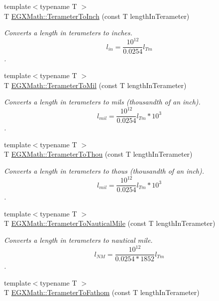 \begin{DoxyCompactItemize}
{\footnotesize template$<$typename T $>$ }\\T \mbox{\hyperlink{group___e_g_x_math-_conversions-_length_conversions-_s_i-_terameter-_imperial_ga85c9ddc82ba02c1fea0b22b896fed936}{E\+G\+X\+Math\+::\+Terameter\+To\+Inch}} (const T length\+In\+Terameter)
\begin{DoxyCompactList}\small\item\em Converts a length in terameters to inches. \[ l_{in}= \frac{10^{12}}{0.0254} l_{Tm} \]. \end{DoxyCompactList}\item 
{\footnotesize template$<$typename T $>$ }\\T \mbox{\hyperlink{group___e_g_x_math-_conversions-_length_conversions-_s_i-_terameter-_imperial_ga9ae6fa58a9800d91e89f76e68838fa86}{E\+G\+X\+Math\+::\+Terameter\+To\+Mil}} (const T length\+In\+Terameter)
\begin{DoxyCompactList}\small\item\em Converts a length in terameters to mils (thousandth of an inch). \[ l_{mil}= \frac{10^{12}}{0.0254} l_{Tm} * 10^{3} \]. \end{DoxyCompactList}\item 
{\footnotesize template$<$typename T $>$ }\\T \mbox{\hyperlink{group___e_g_x_math-_conversions-_length_conversions-_s_i-_terameter-_imperial_ga3e00f52eb5c96d53031f36d7003a0e5e}{E\+G\+X\+Math\+::\+Terameter\+To\+Thou}} (const T length\+In\+Terameter)
\begin{DoxyCompactList}\small\item\em Converts a length in terameters to thous (thousandth of an inch). \[ l_{mil}= \frac{10^{12}}{0.0254} l_{Tm} * 10^{3} \]. \end{DoxyCompactList}\item 
{\footnotesize template$<$typename T $>$ }\\T \mbox{\hyperlink{group___e_g_x_math-_conversions-_length_conversions-_s_i-_terameter-_nautical_ga6a799ea329334a189c2ed5a898a238af}{E\+G\+X\+Math\+::\+Terameter\+To\+Nautical\+Mile}} (const T length\+In\+Terameter)
\begin{DoxyCompactList}\small\item\em Converts a length in terameters to nautical mile. \[ l_{NM}= \frac{10^{12}}{0.0254 * 1852} l_{Tm} \]. \end{DoxyCompactList}\item 
{\footnotesize template$<$typename T $>$ }\\T \mbox{\hyperlink{group___e_g_x_math-_conversions-_length_conversions-_s_i-_terameter-_nautical_gaef70a960ef5e91001f3ff2bfeb0d96bf}{E\+G\+X\+Math\+::\+Terameter\+To\+Fathom}} (const T length\+In\+Terameter)

\end{DoxyCompactItemize}
